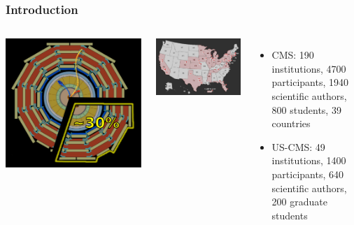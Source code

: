 \documentclass[compress]{beamer}
\begin{document}
\begin{frame}
\frametitle{Introduction}
\begin{columns}
\includegraphics[width=\linewidth]{CMS_homepage.pdf}

\includegraphics[width=\linewidth]{usa-map.jpg}
\begin{itemize}
\item CMS: 190 institutions, 4700 participants, 1940 scientific
  authors, 800 students, 39 countries

\item US-CMS: 49 institutions, 1400 participants, 640 scientific
  authors, 200 graduate students


\end{itemize}
\end{columns}
\end{frame}
\end{document}
